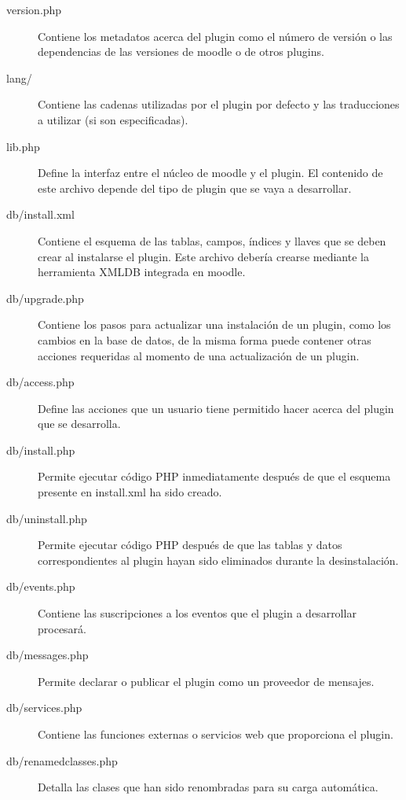 \begin{description}
    \item[version.php] Contiene los metadatos acerca del plugin como el número de versión o las dependencias de las versiones de moodle o de otros plugins.

    \item[lang/] Contiene las cadenas utilizadas por el plugin por defecto y las traducciones a utilizar (si son especificadas).

    \item[lib.php] Define la interfaz entre el núcleo de moodle y el plugin. El contenido de este archivo depende del tipo de plugin que se vaya a desarrollar.

    \item[db/install.xml] Contiene el esquema de las tablas, campos, índices y llaves que se deben crear al instalarse el plugin. Este archivo debería crearse mediante la herramienta XMLDB integrada en moodle.

    \item[db/upgrade.php] Contiene los pasos para actualizar una instalación de un plugin, como los cambios en la base de datos, de la misma forma puede contener otras acciones requeridas al momento de una actualización de un plugin.

    \item[db/access.php] Define las acciones que un usuario tiene permitido hacer acerca del plugin que se desarrolla.

    \item[db/install.php] Permite ejecutar código PHP inmediatamente después de que el esquema presente en install.xml ha sido creado.

    \item[db/uninstall.php] Permite ejecutar código PHP después de que las tablas y datos correspondientes al plugin hayan sido eliminados durante la desinstalación.

    \item[db/events.php] Contiene las suscripciones a los eventos que el plugin a desarrollar procesará.

    \item[db/messages.php] Permite declarar o publicar el plugin como un proveedor de mensajes.

    \item[db/services.php] Contiene las funciones externas o servicios web que proporciona el plugin.

    \item[db/renamedclasses.php] Detalla las clases que han sido renombradas para su carga automática.


\end{description}

